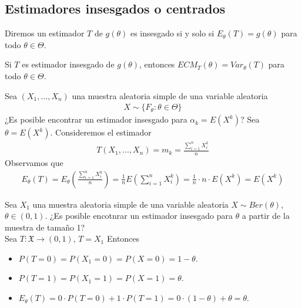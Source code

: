 \subsection{Estimadores insesgados o centrados}

\begin{defi}
Diremos un estimador $T$ de $g(\theta)$ es insesgado si y solo si $E_{\theta}(T) = g(\theta)$ para todo $\theta \in \Theta$.
\end{defi}

\begin{obs}
Si $T$ es estimador insesgado de $g(\theta)$, entonces $ECM_{T}(\theta) = Var_{\theta}(T)$ para todo $\theta \in \Theta$.
\end{obs}
\begin{ejemplo}
Sea $(X_1,...,X_n)$ una muestra aleatoria simple de una variable aleatoria
\begin{align*}
    X \sim \{F_{\theta} : \theta \in \Theta \}
\end{align*}
¿Es posible encontrar un estimador insesgado para $\alpha_k = E\left(X^k\right)$? Sea $\theta = E\left(X^k\right)$. Consideremos el estimador
\begin{align*}
    T(X_1,...,X_n) = m_k= \frac{\sum_{i=1}^{n}{X_i^k}}{n}
\end{align*}
Observamos que
\begin{align*}
    E_{\theta}(T) = E_{\theta}\left( \frac{\sum_{i=1}^{n}{X_i^k}}{n} \right) = \frac{1}{n}E\left( \sum_{i=1}^{n}{X_i^k} \right) = \frac{1}{n} \cdot n \cdot E\left( X^k\right) = E\left( X^k\right)
\end{align*}
\end{ejemplo}

\begin{ejemplo}
Sea $X_1$ una muestra aleatoria simple de una variable aleatoria $X \sim Ber(\theta)$, $\theta \in (0,1)$. ¿Es posible encotnrar un estimador insesgado para $\theta$ a partir de la muestra de tamaño 1?
\\
\newline
Sea $T : \mathfrak{X} \longrightarrow (0,1)$, $T = X_1$ Entonces
\begin{itemize}
    \item $P(T = 0) = P(X_1 = 0) = P(X = 0) = 1 - \theta$.
    \item $P(T = 1) = P(X_1 = 1) = P(X = 1) = \theta$.
    \item $E_{\theta}(T) = 0 \cdot P(T = 0) + 1 \cdot P(T = 1) = 0 \cdot (1 - \theta) + \theta = \theta$.
\end{itemize}
\end{ejemplo}

